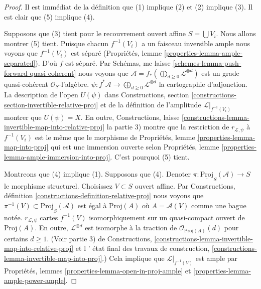 \begin{proof}
Il est immédiat de la définition que (1) implique (2) et (2) implique (3). Il est clair que (5) implique (4).

\medskip\noindent

Supposons que (3) tient pour le recouvrement ouvert affine $S = \bigcup V_i$. Nous allons montrer (5) tient. Puisque chacun $f^{-1}(V_i)$ a un faisceau inversible ample nous voyons que $f^{-1}(V_i)$ est séparé (Propriétés, lemme \ref{properties-lemma-ample-separated}). D'où $f$ est séparé. Par Schémas, me laisse \ref{schemes-lemma-push-forward-quasi-coherent}
nous voyons que $\mathcal{A} = f_*(\bigoplus_{d \geq 0} \mathcal{L}^{\otimes d})$
est un grade quasi-cohérent $\mathcal{O}_S$-l'algèbre. $\psi : f^*\mathcal{A} \to \bigoplus_{d \geq 0} \mathcal{L}^{\otimes d}$
la cartographie d'adjonction. La description de l'open $U(\psi)$ dans Constructions, section
\ref{constructions-section-invertible-relative-proj}
et de la définition de l'amplitude $\mathcal{L}|_{f^{-1}(V_i)}$ montrer que $U(\psi) = X$. En outre, Constructions, laisse \ref{constructions-lemma-invertible-map-into-relative-proj} la partie 3) montre que la restriction de $r_{\mathcal{L}, \psi}$ à
$f^{-1}(V_i)$ est le même que le morphisme de Propriétés, lemme \ref{properties-lemma-map-into-proj}
qui est une immersion ouverte selon Propriétés, lemme \ref{properties-lemma-ample-immersion-into-proj}. C'est pourquoi (5) tient.

\medskip\noindent

Montreons que (4) implique (1). Supposons que (4). Denoter $\pi : \underline{\text{Proj}}_S(\mathcal{A}) \to S$
le morphisme structurel. Choisissez $V \subset S$ ouvert affine. Par Constructions, définition \ref{constructions-definition-relative-proj}
nous voyons que $\pi^{-1}(V) \subset \underline{\text{Proj}}_S(\mathcal{A})$
est égal à $\text{Proj}(A)$ où $A = \mathcal{A}(V)$
comme une bague notée. $r_{\mathcal{L}, \psi}$ cartes
$f^{-1}(V)$ isomorphiquement sur un quasi-compact ouvert de $\text{Proj}(A)$. En outre, $\mathcal{L}^{\otimes d}$ est isomorphe à la traction de
$\mathcal{O}_{\text{Proj}(A)}(d)$ pour certains $d \geq 1$. (Voir partie 3) de Constructions, \ref{constructions-lemma-invertible-map-into-relative-proj}
et l ' état final des travaux de construction, \ref{constructions-lemma-invertible-map-into-proj}.) Cela implique que $\mathcal{L}|_{f^{-1}(V)}$ est ample par Propriétés, lemmes \ref{properties-lemma-open-in-proj-ample}
et \ref{properties-lemma-ample-power-ample}.


\end{proof}
